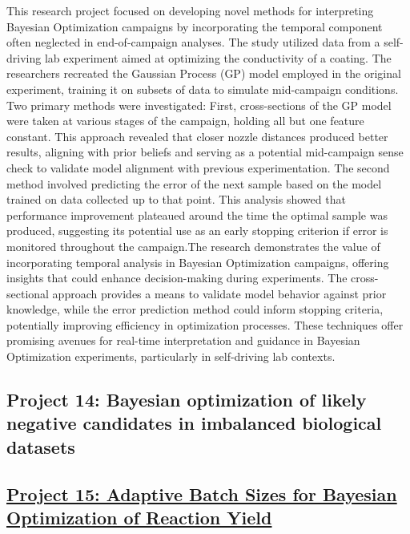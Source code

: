 This research project focused on developing novel methods for interpreting Bayesian Optimization campaigns by incorporating the temporal component often neglected in end-of-campaign analyses. The study utilized data from a self-driving lab experiment aimed at optimizing the conductivity of a coating. The researchers recreated the Gaussian Process (GP) model employed in the original experiment, training it on subsets of data to simulate mid-campaign conditions. Two primary methods were investigated: First, cross-sections of the GP model were taken at various stages of the campaign, holding all but one feature constant. This approach revealed that closer nozzle distances produced better results, aligning with prior beliefs and serving as a potential mid-campaign sense check to validate model alignment with previous experimentation. The second method involved predicting the error of the next sample based on the model trained on data collected up to that point. This analysis showed that performance improvement plateaued around the time the optimal sample was produced, suggesting its potential use as an early stopping criterion if error is monitored throughout the campaign.The research demonstrates the value of incorporating temporal analysis in Bayesian Optimization campaigns, offering insights that could enhance decision-making during experiments. The cross-sectional approach provides a means to validate model behavior against prior knowledge, while the error prediction method could inform stopping criteria, potentially improving efficiency in optimization processes. These techniques offer promising avenues for real-time interpretation and guidance in Bayesian Optimization experiments, particularly in self-driving lab contexts.
 \subsection*{Project 14: Bayesian optimization of likely negative candidates in imbalanced biological datasets}


 \subsection*{\href{https://www.youtube.com/watch?v=utnWbJsObF0}{Project 15: Adaptive Batch Sizes for Bayesian Optimization of Reaction Yield}}

